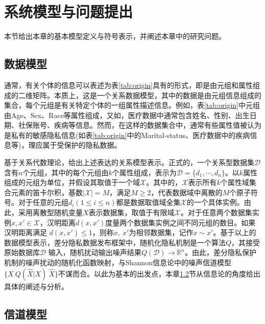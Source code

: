 \section{系统模型与问题提出}\label{chapter05-system-model}

本节给出本章的基本模型定义与符号表示，并阐述本章中的研究问题。

\subsection{数据模型}
通常，有关个体的信息可以表述为表\ref{tab:origin}具有的形式，即是由元组和属性组成的二维矩阵。本质上，这是一个关系数据模型，其中的数据是由元组信息组成的集合，每个元组是有关特定个体的一组属性描述信息。例如，表\ref{tab:origin}中元组由Age、Sex、Race等属性组成，又如，医疗数据中通常包含姓名、性别、出生日期、社保账号、疾病等信息。然而，在这样的数据集合中，通常有些属性值被认为是私有的敏感隐私信息(如表\ref{tab:origin}中的Marital-status、医疗数据中的疾病信息等)，理应属于受保护的隐私数据。

基于关系代数理论，给出上述表达的关系模型表示。正式的，一个关系型数据集$\mathcal{D}$含有$n$个元组，其中的每个元组由$k$个属性组成，表示为$\mathcal{D}=\{d_1,\cdots,d_n\}$。以$k$属性组成的元组为单位，并假设其取值于一个域$\mathcal{X}$。其中的，$\mathcal{X}$表示所有$k$个属性域集合元素的笛卡尔积，基数$|\mathcal{X}|=M$，满足$M \geq 2$，代表数据域中离散的$M$个原子符号。对于任意的元组$d_i(1\leq i \leq n)$都是数据取值域全集$\mathcal{X}$的一个具体实例。由此，采用离散型随机变量$X$表示数据集，取值于有限域$\mathcal{X}$。对于任意两个数据集实例$x,x' \in \mathcal{X}$，汉明距离$d(x,x')$度量两个数据集实例之间不同元组的数目。如果汉明距离满足 $d(x,x')\leq 1$，则称$x,~x'$为相邻数据集，记作$x\sim x'$。基于以上的数据模型表示，差分隐私数据发布框架中，随机化隐私机制是一个算法$Q$，其接受原始数据库$\mathcal{D}$
输入，随机扰动输出噪声结果$Q(\mathcal{D})\rightarrow \mathbb{R}^{n}$\cite{dwork2014algorithmic}。由此，差分隐私保护机制的噪声扰动的随机化函数映射，与Shannon信息论中的噪声信道模型$\{X~Q(\hat{X}|X)~\hat{X}\}$\cite{xiong2016randomized,alvim2011differential}不谋而合。以此为基本的出发点，本章\ref{chapter05-achieve-channel}节从信息论的角度给出具体的阐述与分析。

\subsection{信道模型}\label{chapter05-achieve-channel}

